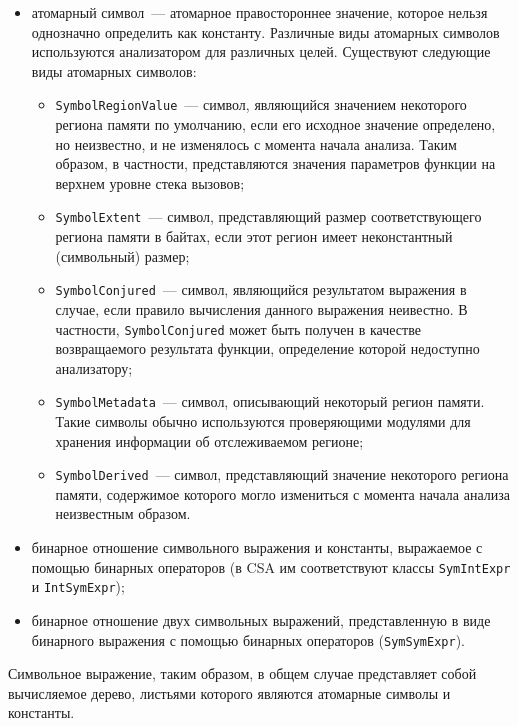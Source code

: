 \begin{itemize}
 \item атомарный символ~--- атомарное правостороннее значение, которое нельзя однозначно определить как константу. Различные виды атомарных символов используются анализатором для различных целей. Существуют следующие виды атомарных символов:
 \begin{itemize}
 \item \texttt{SymbolRegionValue}~--- символ, являющийся значением некоторого региона памяти по умолчанию, если его исходное значение определено, но неизвестно, и не изменялось с момента начала анализа. Таким образом, в частности, представляются значения параметров функции на верхнем уровне стека вызовов;
 \item \texttt{SymbolExtent}~--- символ, представляющий размер соответствующего региона памяти в байтах, если этот регион имеет неконстантный (символьный) размер;
 \item \texttt{SymbolConjured}~--- символ, являющийся результатом выражения в случае, если правило вычисления данного выражения неивестно. В частности, \texttt{SymbolConjured} может быть получен в качестве возвращаемого результата функции, определение которой недоступно анализатору;
 \item \texttt{SymbolMetadata}~--- символ, описывающий некоторый регион памяти. Такие символы обычно используются проверяющими модулями для хранения информации об отслеживаемом регионе;
 \item \texttt{SymbolDerived}~--- символ, представляющий значение некоторого региона памяти, содержимое которого могло измениться с момента начала анализа неизвестным образом.
 \end{itemize}

 \item бинарное отношение символьного выражения и константы, выражаемое с помощью бинарных операторов (в CSA им соответствуют классы \texttt{SymIntExpr} и \texttt{IntSymExpr});
 \item бинарное отношение двух символьных выражений, представленную в виде бинарного выражения с помощью бинарных операторов (\texttt{SymSymExpr}).
\end{itemize}

Символьное выражение, таким образом, в общем случае представляет собой вычисляемое дерево, листьями которого являются атомарные символы и константы.

